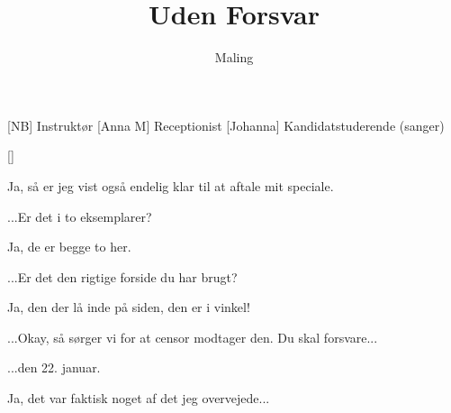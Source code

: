 \documentclass[a4paper,11pt]{article}
\title{Uden Forsvar}
\author{Maling}
\begin{document}
\maketitle

\begin{roles}
[NB] Instruktør
[Anna M] Receptionist
[Johanna] Kandidatstuderende (sanger)
\end{roles}

\begin{props}
[]
\end{props}


\begin{sketch}

 Ja, så er jeg vist også endelig klar til at aftale mit speciale.

 ...Er det i to eksemplarer?

 Ja, de er begge to her.

 ...Er det den rigtige forside du har brugt?

 Ja, den der lå inde på siden, den er i vinkel!

 ...Okay, så sørger vi for at censor modtager den. Du skal forsvare...


 ...den 22. januar.

 Ja, det var faktisk noget af det jeg overvejede...

\end{sketch}
\end{document}
